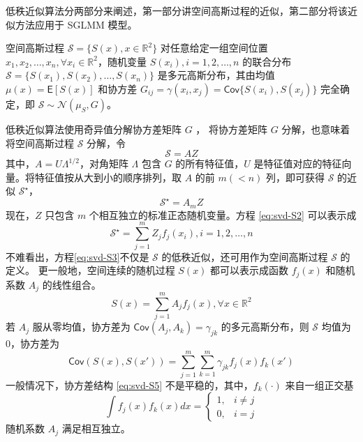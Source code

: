 \documentclass[12pt,a4paper,UTF8,twoside]{book}
\theoremstyle{definition}
\theoremstyle{definition}
\theoremstyle{definition}
\theoremstyle{remark}
\begin{document}
低秩近似算法分两部分来阐述，第一部分讲空间高斯过程的近似，第二部分将该近似方法应用于
SGLMM 模型。

空间高斯过程 \(\mathcal{S} = \{S(x),x\in\mathbb{R}^2\}\)
对任意给定一组空间位置
\(x_1,x_2,\ldots,x_n, \forall x_{i} \in \mathbb{R}^2\)，随机变量
\(S(x_i),i = 1,2,\ldots,n\) 的联合分布
\(\mathcal{S}=\{S(x_1),S(x_2),\ldots,S(x_n)\}\) 是多元高斯分布，其由均值
\(\mu(x) = \mathsf{E}[S(x)]\) 和协方差
\(G_{ij} =\gamma(x_i,x_j)= \mathsf{Cov}\{S(x_i),S(x_j)\}\) 完全确定，即
\(\mathcal{S} \sim \mathcal{N}(\mu_{S},G)\)。

低秩近似算法使用奇异值分解协方差矩阵 \(G\) \citep{Diggle2007}，
将协方差矩阵 \(G\) 分解，也意味着将空间高斯过程 \(\mathcal{S}\) 分解，令
\[\mathcal{S} = AZ\] \noindent 其中，\(A = U\Lambda^{1/2}\)，对角矩阵
\(\Lambda\) 包含 \(G\) 的所有特征值，\(U\)
是特征值对应的特征向量。将特征值按从大到小的顺序排列，取 \(A\) 的前
\(m(<n)\) 列，即可获得 \(\mathcal{S}\) 的近似 \(\mathcal{S}^{\star}\)，
\begin{equation}
\mathcal{S}^{\star} = A_{m}Z \label{eq:svd-S2}
\end{equation} \noindent 现在，\(Z\) 只包含 \(m\)
个相互独立的标准正态随机变量。方程 \eqref{eq:svd-S2} 可以表示成
\begin{equation}
\mathcal{S}^{\star} = \sum_{j=1}^{m}Z_{j}f_{j}(x_{i}), i = 1,2,\ldots,n \label{eq:svd-S3}
\end{equation} \noindent 不难看出，方程\eqref{eq:svd-S3}不仅是
\(\mathcal{S}\) 的低秩近似，还可用作为空间高斯过程 \(\mathcal{S}\)
的定义。 更一般地，空间连续的随机过程 \(S(x)\) 都可以表示成函数
\(f_{j}(x)\) 和随机系数 \(A_{j}\) 的线性组合。 \begin{equation}
S(x) = \sum_{j=1}^{m}A_{j}f_{j}(x), \forall x \in \mathbb{R}^2 \label{eq:svd-S4}
\end{equation} \noindent 若 \(A_j\) 服从零均值，协方差为
\(\mathsf{Cov}(A_{j},A_{k})=\gamma_{jk}\) 的多元高斯分布，则
\(\mathcal{S}\) 均值为0，协方差为 \begin{equation}
\mathsf{Cov}(S(x),S(x')) =  \sum_{j=1}^{m}\sum_{k=1}^{m}\gamma_{jk}f_{j}(x)f_{k}(x') \label{eq:svd-S5}
\end{equation} \noindent 一般情况下，协方差结构 \eqref{eq:svd-S5}
不是平稳的，其中，\(f_{k}(\cdot)\) 来自一组正交基 \begin{equation*}
\int f_{j}(x)f_{k}(x)dx = 
\begin{cases}
1, & i \neq j \\
0, & i = j
\end{cases}
\end{equation*} \noindent  随机系数 \(A_{j}\) 满足相互独立。
\end{document}
